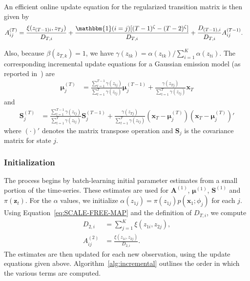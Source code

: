 \documentclass[12pt]{article}
\begin{document}
An efficient online update equation for the regularized transition matrix is then given by
\begin{align*}
    A_{ij}^{(T)} &= \frac{\xi(z_{(T-1)i}, z_{Tj})}{D_{T,i}} + \frac{\mathbbm{1}(i = j)[(T-1)^\zeta - (T-2)^\zeta]}{D_{T,i}} + \frac{D_{(T-1), i}}{D_{T,i}}A_{ij}^{(T-1)}.
\end{align*}

Also, because $\beta(z_{T,k}) = 1$, we have $\gamma(z_{tk}) = \alpha(z_{tk}) / \sum_{i=1}^{K}\alpha(z_{ti})$. The corresponding incremental update equations for a Gaussian emission model (as reported in~\cite{stenger2001}) are 
\begin{align*}
    \mathbf{\mu}_{j}^{(T)} &= \frac{\sum_{t=1}^{T-1}\gamma(z_{tj})}{\sum_{t=1}^{T}\gamma(z_{tj})}\mathbf{\mu}_{j}^{(T-1)} + \frac{\gamma(z_{Tj})}{\sum_{t=1}^{T}\gamma(z_{tj})}\mathbf{x}_T
\end{align*}
and
\begin{align*}
    \mathbf{S}_j^{(T)} &= \frac{\sum_{t=1}^{T-1}\gamma(z_{tj})}{\sum_{t=1}^{T}\gamma(z_{tj})}\mathbf{S}_j^{(T-1)} + \frac{\gamma(z_{Tj})}{\sum_{t=1}^{T}\gamma(z_{tj})}\left(\mathbf{x}_T - \mathbf{\mu}_j^{(T)}\right)\left(\mathbf{x}_T - \mathbf{\mu}_j^{(T)}\right)'
\end{align*}
where $(\cdot)'$ denotes the matrix transpose operation and $\mathbf{S}_j$ is the covariance matrix for state $j$.

\subsubsection{Initialization}

The process begins by batch-learning initial parameter estimates from a small portion of the time-series. These estimates are used for $\mathbf{A}^{(1)}$, $\mathbf{\mu}^{(1)}$, $\mathbf{S}^{(1)}$ and $\pi(\mathbf{z}_t)$. For the $\alpha$ values, we initialize $\alpha(z_{1j}) = \pi(z_{1j})p(\mathbf{x}_1; \phi_j)$ for each $j$. Using Equation~\ref{eq:SCALE-FREE-MAP} and the definition of $D_{T,i}$, we compute
\begin{align*}
    D_{2,i} &= \sum_{j=1}^{K} \xi(z_{1i}, z_{2j}), \\
    A_{ij}^{(2)} &= \frac{\xi(z_{1i}, z_{2j})}{D_{2,i}}.
\end{align*}
The estimates are then updated for each new observation, using the update equations given above. Algorithm~\ref{alg:incremental} outlines the order in which the various terms are computed.
\end{document}
